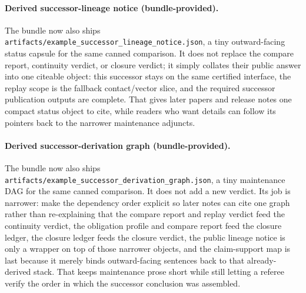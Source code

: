 \documentclass[11pt]{article}
\begin{document}
\paragraph{Derived successor-lineage notice (bundle-provided).}
The bundle now also ships \texttt{artifacts/example\_successor\_lineage\_notice.json}, a tiny outward-facing status capsule for the same canned comparison. It does not replace the compare report, continuity verdict, or closure verdict; it simply collates their public answer into one citeable object: this successor stays on the same certified interface, the replay scope is the fallback contact/vector slice, and the required successor publication outputs are complete. That gives later papers and release notes one compact status object to cite, while readers who want details can follow its pointers back to the narrower maintenance adjuncts.

\paragraph{Derived successor-derivation graph (bundle-provided).}
The bundle now also ships \texttt{artifacts/example\_successor\_derivation\_graph.json}, a tiny maintenance DAG for the same canned comparison. It does not add a new verdict. Its job is narrower: make the dependency order explicit so later notes can cite one graph rather than re-explaining that the compare report and replay verdict feed the continuity verdict, the obligation profile and compare report feed the closure ledger, the closure ledger feeds the closure verdict, the public lineage notice is only a wrapper on top of those narrower objects, and the claim-support map is last because it merely binds outward-facing sentences back to that already-derived stack. That keeps maintenance prose short while still letting a referee verify the order in which the successor conclusion was assembled.
\end{document}
